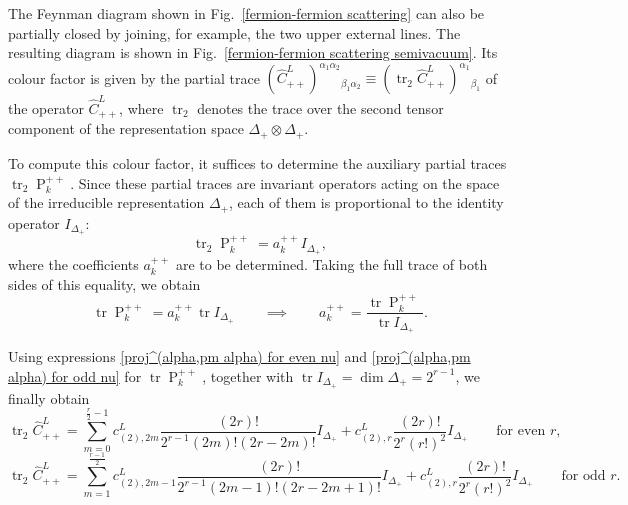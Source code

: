 \documentclass[a4paper]{article}
\newcommand{\hC}{\widehat{C}}
\renewcommand{\=}{\ =\ }
\DeclareMathOperator{\proj}{P}
\DeclareMathOperator{\tr}{tr}
\numberwithin{equation}{section}
\theoremstyle{remark}
\begin{document}
The Feynman diagram shown in Fig.~\ref{fermion-fermion scattering} can also be partially closed by joining, for example, the two upper external lines. The resulting diagram is shown in Fig.~\ref{fermion-fermion scattering semivacuum}. Its colour factor is given by the partial trace $(\hC_{++}^L)^{\alpha_1\alpha_2}{}_{\beta_1\alpha_2} \equiv (\tr_2 \hC_{++}^{L})^{\alpha_1}{}_{\beta_1}$ of the operator $\hC_{++}^L$, where $\tr_2$ denotes the trace over the second tensor component of the representation space $\Delta_+ \otimes \Delta_+$.

To compute this colour factor, it suffices to determine the auxiliary partial traces $\tr_2 \proj_{k}^{++}$. Since these partial traces are invariant operators acting on the space of the irreducible representation $\Delta_+$, each of them is proportional to the identity operator $I_{\Delta_+}$:
\begin{equation}
\tr_2 \proj_k^{++} = a_k^{++} I_{\Delta_+},
\end{equation}
where the coefficients $a_k^{++}$ are to be determined. Taking the full trace of both sides of this equality, we obtain
\begin{equation}
\tr \proj_k^{++}
=
a_k^{++} \tr I_{\Delta_+}
\qquad \implies \qquad
a_k^{++}
=
\frac{\tr \proj_k^{++}}{\tr I_{\Delta_+}}.
\end{equation}

Using expressions \eqref{proj^(alpha,pm alpha) for even nu} and \eqref{proj^(alpha,pm alpha) for odd nu} for $\tr \proj_{k}^{++}$, together with $\tr I_{\Delta_+} = \dim \Delta_+ = 2^{r-1}$, we finally obtain
\begin{equation}
\tr_2 \hC_{++}^L
=
\sum_{m=0}^{\frac{r}{2}-1}
c_{(2),2m}^L
\frac{(2r)!}{2^{r-1}(2m)!(2r-2m)!}
I_{\Delta_+}
+
c_{(2),r}^L
\frac{(2r)!}{2^r (r!)^2}
I_{\Delta_+}
\qquad
\text{for even } r,
\end{equation}
\begin{equation}
\tr_2 \hC_{++}^L
=
\sum_{m=1}^{\frac{r-1}{2}}
c_{(2),2m-1}^L
\frac{(2r)!}{2^{r-1}(2m-1)!(2r-2m+1)!}
I_{\Delta_+}
+
c_{(2),r}^L
\frac{(2r)!}{2^r (r!)^2}
I_{\Delta_+}
\qquad
\text{for odd } r.
\end{equation}
\end{document}
